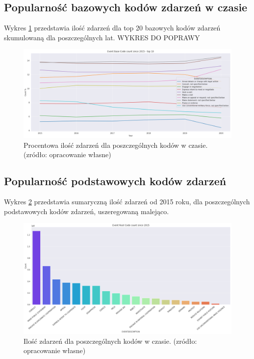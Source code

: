 \documentclass[11pt]{report}
\begin{document}
 \subsection{Popularność bazowych kodów zdarzeń w czasie}
  Wykres \ref{fig:GLOBALEBCperc} przedstawia ilość zdarzeń dla top 20 bazowych kodów zdarzeń skumulowaną dla poszczególnych lat.
   WYKRES DO POPRAWY
     \begin{figure}[ht]
	\centering
	\includegraphics[width=0.8 \textwidth]{fig/GLOBAL/EBCperc.png}
	\caption{Procentowa ilość zdarzeń dla poszczególnych kodów w czasie. (zródło: opracowanie własne)}
	\label{fig:GLOBALEBCperc}
	\end{figure}
	
 \subsection{Popularność podstawowych kodów zdarzeń}
  	Wykres \ref{fig:GLOBALERC} przedstawia sumaryczną ilość zdarzeń od 2015 roku, dla poszczególnych podstawowych kodów zdarzeń, uszeregowaną malejąco.
  	  \begin{figure}[ht]
	\centering
	\includegraphics[width=0.8 \textwidth]{fig/GLOBAL/ERC.png}
	\caption{Ilość zdarzeń dla poszczególnych kodów w czasie. (zródło: opracowanie własne)}
	\label{fig:GLOBALERC}
	\end{figure}
	
\end{document}
